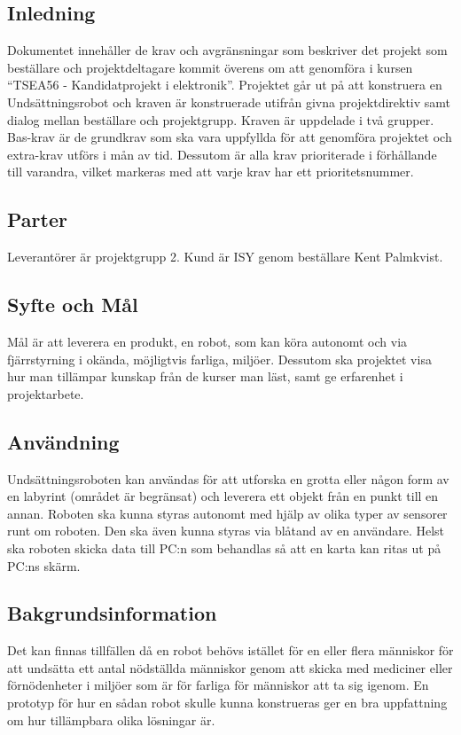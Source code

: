 \documentclass[11pt]{article}
\begin{document}
\pagebreak

\begin{flushleft}

\section{Inledning}

Dokumentet innehåller de krav och avgränsningar som beskriver det projekt som beställare och projektdeltagare kommit överens om att genomföra i kursen “TSEA56 - Kandidatprojekt i elektronik”. Projektet går ut på att konstruera en Undsättningsrobot och kraven är konstruerade utifrån givna projektdirektiv samt dialog mellan beställare och projektgrupp.
Kraven är uppdelade i två grupper. Bas-krav är de grundkrav som ska vara uppfyllda för att genomföra projektet och extra-krav utförs i mån av tid. Dessutom är alla krav prioriterade i förhållande till varandra, vilket markeras med att varje krav har ett prioritetsnummer.

\subsection{Parter}
Leverantörer är projektgrupp 2. Kund är ISY genom beställare Kent Palmkvist.

\subsection{Syfte och Mål}
Mål är att leverera en produkt, en robot, som kan köra autonomt och via fjärrstyrning i okända, möjligtvis farliga, miljöer. Dessutom ska projektet visa hur man tillämpar kunskap från de kurser man läst, samt ge erfarenhet i projektarbete.

\subsection{Användning}
Undsättningsroboten kan användas för att utforska en grotta eller någon form av en labyrint (området är begränsat) och leverera ett objekt från en punkt till en annan. 
Roboten ska kunna styras autonomt med hjälp av olika typer av sensorer runt om roboten. Den ska även kunna styras via blåtand av en användare. 
Helst ska roboten skicka data till PC:n som behandlas så att en karta kan ritas ut på PC:ns skärm.

\subsection{Bakgrundsinformation}
Det kan finnas tillfällen då en robot behövs istället för en eller flera människor för att undsätta ett antal nödställda människor genom att skicka med mediciner eller förnödenheter i miljöer som är för farliga för människor att ta sig igenom. En prototyp för hur en sådan robot skulle kunna konstrueras ger en bra uppfattning om hur tillämpbara olika lösningar är.


\end{flushleft}
\end{document}
